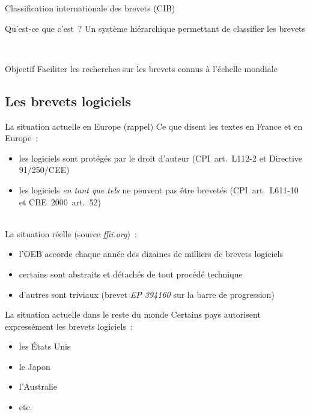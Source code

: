 \documentclass{beamer}
\begin{document}
\begin{frame}{Classification internationale des brevets (CIB)}
    \begin{block}{Qu'est-ce que c'est~?}
        Un système hiérarchique permettant de classifier les brevets
    \end{block}
    ~\\
    \begin{block}{Objectif}
        Faciliter les recherches sur les brevets connus à l'échelle mondiale
    \end{block}
\end{frame}


\subsection{Les brevets logiciels}

\begin{frame}{La situation actuelle en Europe (rappel)}
    Ce que disent les textes en France et en Europe~:
    \begin{itemize}
        \item les logiciels sont protégés par le droit d'auteur (CPI~art.~L112-2 et Directive 91/250/CEE)
        \item les logiciels \emph{en tant que tels} ne peuvent pas être brevetés (CPI~art.~L611-10 et CBE~2000~art.~52)
    \end{itemize}
    ~\\
    La situation réelle (source \emph{ffii.org})~:
    \begin{itemize}
        \item l'OEB accorde chaque année des dizaines de milliers de brevets logiciels
        \item certains sont abstraits et détachés de tout procédé technique
        \item d'autres sont \og{}triviaux\fg{} (brevet \emph{EP 394160} sur la barre de progression)
    \end{itemize}
\end{frame}

\begin{frame}{La situation actuelle dans le reste du monde}
    Certains pays autorisent expressément les brevets logiciels~:
    \begin{itemize}
        \item les États Unis
        \item le Japon
        \item l'Australie
        \item etc.
    \end{itemize}
\end{frame}
\end{document}
